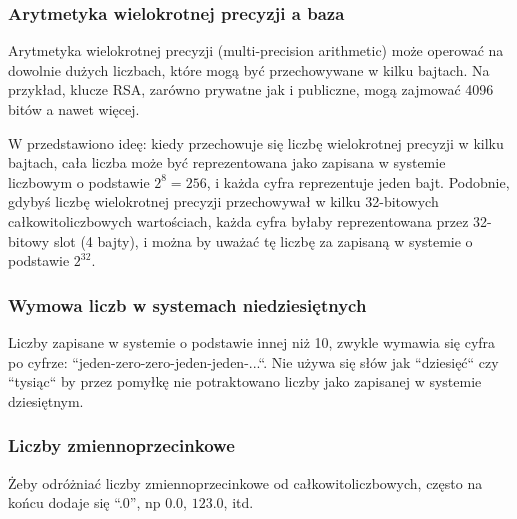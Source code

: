 \subsubsection{Arytmetyka wielokrotnej precyzji a baza}

Arytmetyka wielokrotnej precyzji (multi-precision arithmetic) może operować na dowolnie dużych liczbach,
które mogą być przechowywane w kilku bajtach.
Na przykład, klucze RSA, zarówno prywatne jak i publiczne, mogą zajmować 4096 bitów a nawet więcej.

W  przedstawiono ideę: kiedy przechowuje się liczbę wielokrotnej precyzji w kilku bajtach,
cała liczba może być reprezentowana jako zapisana w systemie liczbowym o podstawie $2^8=256$, i każda cyfra reprezentuje jeden bajt.
Podobnie, gdybyś liczbę wielokrotnej precyzji przechowywał w kilku 32-bitowych całkowitoliczbowych wartościach,
każda cyfra byłaby reprezentowana przez 32-bitowy slot (4 bajty), i można by uważać tę liczbę za zapisaną w systemie o podstawie $2^{32}$.

\subsubsection{Wymowa liczb w systemach niedziesiętnych}

Liczby zapisane w systemie o podstawie innej niż 10, zwykle wymawia się cyfra po cyfrze: ``jeden-zero-zero-jeden-jeden-...``. Nie używa się słów jak ``dziesięć`` czy ``tysiąc`` by przez pomyłkę nie potraktowano liczby jako zapisanej w systemie dziesiętnym.

\subsubsection{Liczby zmiennoprzecinkowe}

Żeby odróżniać liczby zmiennoprzecinkowe od całkowitoliczbowych, często na końcu dodaje się ``.0'',
np $0.0$, $123.0$, itd.



